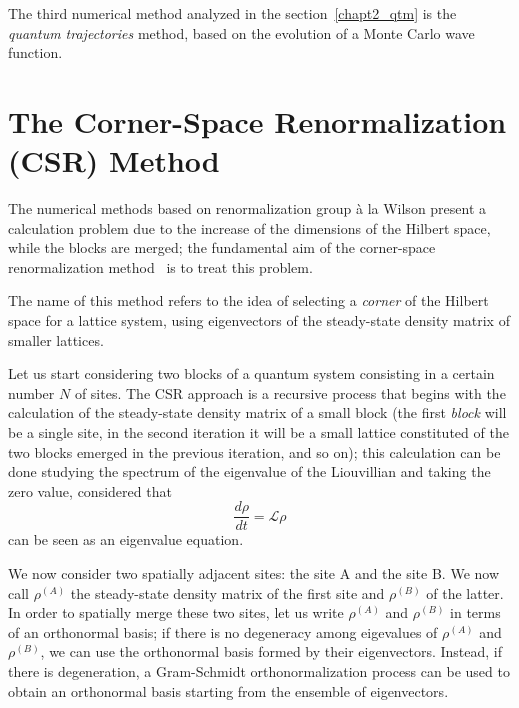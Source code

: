 The third numerical method analyzed in the section~\ref{chapt2_qtm} is the \emph{quantum trajectories} method, based on the evolution of a Monte Carlo wave function.

\section{The Corner-Space Renormalization (CSR) Method}
\label{chapter2_csr}
The numerical methods based on renormalization group à la Wilson present a calculation problem due to the increase of the dimensions of the Hilbert space, while the blocks are merged; the fundamental aim of the corner-space renormalization method~\cite{PhysRevLett.115.080604} is to treat this problem.

The name of this method refers to the idea of selecting a \emph{corner} of the Hilbert space for a lattice system, using eigenvectors of the steady-state density matrix of smaller lattices.

Let us start considering two blocks of a quantum system consisting in a certain number $N$ of sites. The CSR approach is a recursive process that begins with the calculation of the steady-state density matrix of a small block (the first \emph{block} will be a single site, in the second iteration it will be a small lattice constituted of the two blocks emerged in the previous iteration, and so on); this calculation can be done studying the spectrum of the eigenvalue of the Liouvillian and taking the zero value, considered that
\begin{equation}
    \frac{d\rho}{dt} = \mathcal{L} \rho
\end{equation}
can be seen as an eigenvalue equation.

We now consider two spatially adjacent sites: the site A and the site B. We now call $\rho^{(A)}$ the steady-state density matrix of the first site and $\rho^{(B)}$ of the latter. In order to spatially merge these two sites, let us write $\rho^{(A)}$ and $\rho^{(B)}$ in terms of an orthonormal basis; if there is no degeneracy among eigevalues of $\rho^{(A)}$ and $\rho^{(B)}$, we can use the orthonormal basis formed by their eigenvectors. Instead, if there is degeneration, a Gram-Schmidt orthonormalization process can be used to obtain an orthonormal basis starting from the ensemble of eigenvectors.


